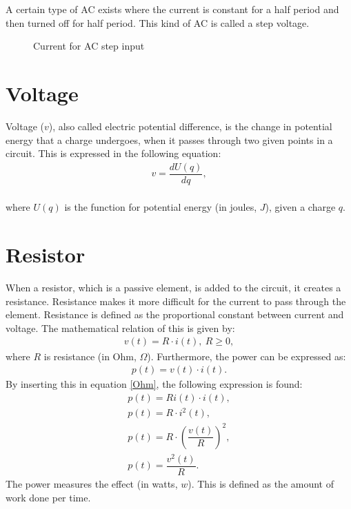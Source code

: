 \noindent A certain type of AC exists where the current is constant for a half period and then turned off for half period. This kind of AC is called a step voltage.
\begin{figure}[H] 

\caption{Current for AC step input}
\end{figure}
\section{Voltage}
Voltage ($v$), also called electric potential difference, is the change in potential energy that a charge undergoes, when it passes through two given points in a circuit. This is expressed in the following equation:
\begin{align*}
	v=\dfrac{dU(q)}{dq},
\end{align*}
\\
where $U(q)$ is the function for potential energy (in joules, $J$), given a charge $q$.
\section{Resistor}
When a resistor, which is a passive element, is added to the circuit, it creates a resistance. Resistance makes it more difficult for the current to pass through the element. Resistance is defined as the proportional constant between current and voltage. The mathematical relation of this is given by: \cite[p.~22]{bcircuit5}
\begin{align} 
\label{Ohm}
v(t)=R\cdot i(t),\ R\geq0,
\end{align}
where $R$ is resistance (in Ohm, $\Omega$). Furthermore, the power can be expressed as: \cite[p. 22]{bcircuit5} 
\begin{align} 
\label{power}
p(t)=v(t)\cdot i(t).
\end{align}
By inserting this in equation \eqref{Ohm}, the following expression is found:
\begin{align}
p(t)=Ri(t)\cdot i(t), \nonumber \\
p(t)=R \cdot i^2(t), \nonumber \\
p(t)=R \cdot \left(\dfrac{v(t)}{R} \right)^2, \nonumber \\
p(t)=\dfrac{v^2(t)}{R}. \label{resistor:power}
\end{align}
The power measures the effect (in watts, $w$). This is defined as the amount of work done per time. 
